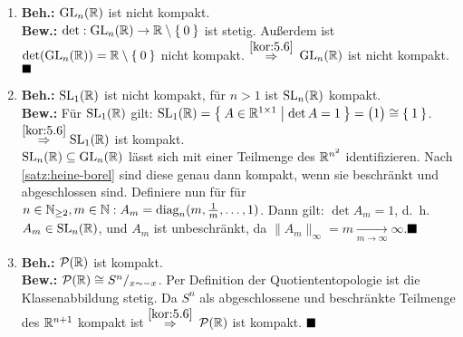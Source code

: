 \begin{solution}[\ref{ub3:aufg1}]
    \begin{enumerate}[label=(\alph*)]
        \item \textbf{Beh.:} $\mathrm{GL}_n(\mathbb{R})$ ist nicht kompakt.\\
            \textbf{Bew.:} $\det: \mathrm{GL}_n(\mathbb{R}) \rightarrow \mathbb{R} \setminus \Set{0}$
                ist stetig. Außerdem ist 
                $\det(\mathrm{GL}_n(\mathbb{R})) = \mathbb{R} \setminus \Set{0}$ nicht 
                kompakt. $\overset{\ref{kor:5.6}}{\Rightarrow}$ 
                $\mathrm{GL}_n(\mathbb{R})$ ist nicht kompakt. $\qed$
        \item \textbf{Beh.:} $\mathrm{SL}_1(\mathbb{R})$ ist nicht kompakt, für $n > 1$ ist $\mathrm{SL}_n(\mathbb{R})$ kompakt.\\
            \textbf{Bew.:} Für $\mathrm{SL}_1(\mathbb{R})$ gilt:
                $\mathrm{SL}_1(\mathbb{R}) = \Set{A \in \ensuremath{\mathbb{R}}^{1 \times 1} | \det A = 1} = \begin{pmatrix}1\end{pmatrix} \cong \Set{1}$.
                $\overset{\ref{kor:5.6}}{\Rightarrow} \mathrm{SL}_1(\mathbb{R})$ ist
                kompakt.\\

                $\mathrm{SL}_n(\mathbb{R}) \subseteq \mathrm{GL}_n(\mathbb{R})$ lässt sich mit einer
                Teilmenge des $\mathbb{R}^{n^2}$ identifizieren. Nach \cref{satz:heine-borel}
                sind diese genau dann kompakt, wenn sie beschränkt und 
                abgeschlossen sind. Definiere nun für für $n \in \mathbb{N}_{\geq 2}, m \in \mathbb{N}: A_m = \text{diag}_n(m, \frac{1}{m}, \dots, 1)$.
                Dann gilt: $\det A_m = 1$, d.~h. $A_m \in \mathrm{SL}_n(\mathbb{R})$,
                und $A_m$ ist unbeschränkt, da $\|A_m\|_\infty =m \xrightarrow[m \rightarrow \infty]{} \infty$.$\qed$
        \item \textbf{Beh.:} $\mathcal{P}(\mathbb{R})$ ist kompakt.\\
            \textbf{Bew.:} $\mathcal{P}(\mathbb{R}) \cong S^n/_{x \sim -x}$.
                Per Definition der Quotiententopologie ist die Klassenabbildung stetig.
                Da $S^n$ als abgeschlossene und beschränkte Teilmenge
                des $\mathbb{R}^{n+1}$ kompakt ist $\overset{\ref{kor:5.6}}{\Rightarrow}$
                $\mathcal{P}(\mathbb{R})$ ist kompakt. $\qed$
    \end{enumerate}
\end{solution}

